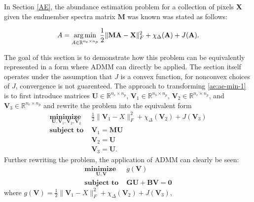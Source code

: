 In Section \ref{AE}, the abundance estimation problem for a collection of pixels $\mathbf{X}$ given the endmember spectra matrix $\mathbf{M}$ was known was stated as follows:

\begin{equation*}
    A = \operatorname*{arg\,min}_{A \in \mathbb{R}^{n_e \times n_p}} \frac{1}{2}\|\mathbf{MA} - \mathbf{X}\|_F^2 + \chi_\Delta(\mathbf{A}) + J(\mathbf{A}).
\end{equation*}

The goal of this section is to demonstrate how this problem can be equivalently represented in a form where ADMM can directly be applied. The section itself operates under the assumption that $J$ is a convex function, for nonconvex choices of $J$, convergence is not guarenteed. The approach to transforming \eqref{ae:ae-min-1} is to first introduce matrices $\mathbf{U} \in \mathbb{R}^{n_e \times n_p}$, $\mathbf{V}_1 \in \mathbb{R}^{n_b \times n_p}$, $\mathbf{V}_2 \in \mathbb{R}^{n_e \times n_p}$, and $\mathbf{V}_{3} \in \mathbb{R}^{n_e \times n_p}$ and rewrite the problem into the equivalent form 
\begin{equation}
    \label{ae:equivalent-admm-1}
    \begin{aligned}
        \underset{\mathbf{U}, \mathbf{V}_1, \mathbf{V}_2, \mathbf{V}_2}{\textbf{minimize }} & \frac{1}{2} \|\mathbf{V}_1 - X \|_F^2 + \chi_{\Delta}(\mathbf{V}_2) + J(\mathbf{V}_3) 
        \\         
        \textbf{subject to } & \mathbf{V}_1 = \mathbf{MU} \\
        &\mathbf{V}_2 = \mathbf{U} \\
        &\mathbf{V}_{3} = \mathbf{U}.
   \end{aligned}
\end{equation}
Further rewriting the problem, the application of ADMM can clearly be seen:
\begin{equation}
    \label{ae:equivalent-admm-2}
    \begin{aligned}
        \underset{\mathbf{U},\mathbf{V}}{\textbf{minimize }} & g(\mathbf{V})
        \\         
        \textbf{subject to } & \mathbf{GU} + \mathbf{BV} = \mathbf{0}
   \end{aligned}
\end{equation}
where 
$
g(\mathbf{V}) = \frac{1}{2} \|\mathbf{V}_1 - X \|_F^2 + \chi_{\Delta}(\mathbf{V}_2) + J(\mathbf{V}_3) 
$, 
